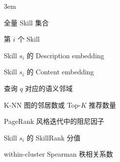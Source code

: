 
\begin{notation}

  \begin{notationlist}{3em}
    \item[$S$] 全量 Skill 集合
    \item[$s_i$] 第 $i$ 个 Skill
    \item[$\mathbf{d}_i$] Skill $s_i$ 的 Description embedding
    \item[$\mathbf{v}_i$] Skill $s_i$ 的 Content embedding
    \item[$\mathcal{N}(q)$] 查询 $q$ 对应的语义邻域
    \item[$K$] K-NN 图的邻居数或 Top-$K$ 推荐数量
    \item[$d$] PageRank 风格迭代中的阻尼因子
    \item[$SR(s_i)$] Skill $s_i$ 的 SkillRank 分值
    \item[$\rho$] within-cluster Spearman 秩相关系数
  \end{notationlist}

\end{notation}
